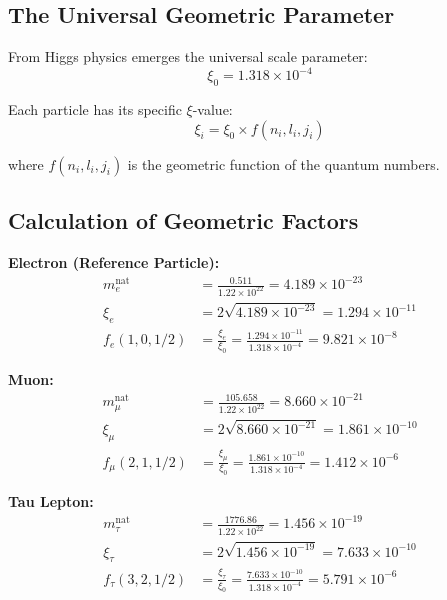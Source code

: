 \documentclass[12pt,a4paper]{article}
\theoremstyle{definition}
\begin{document}
\subsection{The Universal Geometric Parameter}

From Higgs physics emerges the universal scale parameter:
\begin{equation}
	\xi_0 = 1.318 \times 10^{-4}
\end{equation}

Each particle has its specific $\xi$-value:
\begin{equation}
	\xi_i = \xi_0 \times f(n_i, l_i, j_i)
\end{equation}

where $f(n_i, l_i, j_i)$ is the geometric function of the quantum numbers.

\subsection{Calculation of Geometric Factors}

\textbf{Electron (Reference Particle):}
\begin{align}
	m_e^{\text{nat}} &= \frac{0.511}{1.22 \times 10^{22}} = 4.189 \times 10^{-23}\\
	\xi_e &= 2\sqrt{4.189 \times 10^{-23}} = 1.294 \times 10^{-11}\\
	f_e(1,0,1/2) &= \frac{\xi_e}{\xi_0} = \frac{1.294 \times 10^{-11}}{1.318 \times 10^{-4}} = 9.821 \times 10^{-8}
\end{align}

\textbf{Muon:}
\begin{align}
	m_\mu^{\text{nat}} &= \frac{105.658}{1.22 \times 10^{22}} = 8.660 \times 10^{-21}\\
	\xi_\mu &= 2\sqrt{8.660 \times 10^{-21}} = 1.861 \times 10^{-10}\\
	f_\mu(2,1,1/2) &= \frac{\xi_\mu}{\xi_0} = \frac{1.861 \times 10^{-10}}{1.318 \times 10^{-4}} = 1.412 \times 10^{-6}
\end{align}

\textbf{Tau Lepton:}
\begin{align}
	m_\tau^{\text{nat}} &= \frac{1776.86}{1.22 \times 10^{22}} = 1.456 \times 10^{-19}\\
	\xi_\tau &= 2\sqrt{1.456 \times 10^{-19}} = 7.633 \times 10^{-10}\\
	f_\tau(3,2,1/2) &= \frac{\xi_\tau}{\xi_0} = \frac{7.633 \times 10^{-10}}{1.318 \times 10^{-4}} = 5.791 \times 10^{-6}
\end{align}
\end{document}
